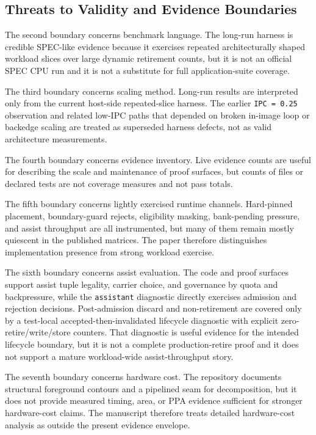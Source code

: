 \documentclass[twocolumn]{article}
\begin{document}
\subsection{Threats to Validity and Evidence Boundaries}

The second boundary concerns benchmark language. The long-run harness is credible SPEC-like evidence because it exercises repeated architecturally shaped workload slices over large dynamic retirement counts, but it is not an official SPEC CPU run and it is not a substitute for full application-suite coverage.

The third boundary concerns scaling method. Long-run results are interpreted only from the current host-side repeated-slice harness. The earlier \texttt{IPC = 0.25} observation and related low-IPC paths that depended on broken in-image loop or backedge scaling are treated as superseded harness defects, not as valid architecture measurements.

The fourth boundary concerns evidence inventory. Live evidence counts are useful for describing the scale and maintenance of proof surfaces, but counts of files or declared tests are not coverage measures and not pass totals.

The fifth boundary concerns lightly exercised runtime channels. Hard-pinned placement, boundary-guard rejects, eligibility masking, bank-pending pressure, and assist throughput are all instrumented, but many of them remain mostly quiescent in the published matrices. The paper therefore distinguishes implementation presence from strong workload exercise.

The sixth boundary concerns assist evaluation. The code and proof surfaces support assist tuple legality, carrier choice, and governance by quota and backpressure, while the \texttt{assistant} diagnostic directly exercises admission and rejection decisions. Post-admission discard and non-retirement are covered only by a test-local accepted-then-invalidated lifecycle diagnostic with explicit zero-retire/write/store counters. That diagnostic is useful evidence for the intended lifecycle boundary, but it is not a complete production-retire proof and it does not support a mature workload-wide assist-throughput story.

The seventh boundary concerns hardware cost. The repository documents structural foreground contours and a pipelined seam for decomposition, but it does not provide measured timing, area, or PPA evidence sufficient for stronger hardware-cost claims. The manuscript therefore treats detailed hardware-cost analysis as outside the present evidence envelope.
\end{document}
